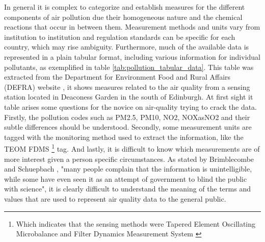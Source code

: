 In general it is complex to categorize and establish measures for the different components of air pollution due their homogeneous nature and the chemical reactions that occur in between them. Measurement methods and units vary from institution to institution and regulation standards can be specific for each country, which may rise ambiguity. Furthermore, much of the available data is represented in a plain tabular format, including various information for individual pollutants, as exemplified in table \ref{tab:pollution_tabular_data}. This table was extracted from the  Department for Environment Food and Rural Affairs (DEFRA) website \cite{DepartmentforEnvironmenta}, it shows measures related to the air quality from a sensing station located in Deaconess Garden in the south of Edinburgh. At first sight it table arises some questions for the novice on air-quality trying to crack the data. Firstly, the pollution codes such as PM2.5, PM10, NO2, NOXasNO2 and their subtle differences should be understood. Secondly, some measurement units are tagged with the monitoring method used to extract the information, like the TEOM FDMS \footnote{Which indicates that the sensing methods were Tapered Element Oscillating Microbalance and Filter Dynamics Measurement System \cite{Quality2005}} tag. And lastly, it is difficult to know which measurements are of more interest given a person specific circumstances. As stated by Brimblecombe and Schuepbach \cite{P.Brimblecombe2008}, "many people complain that the information is unintelligible, while some have even seen it as an attempt of government to blind the public with science", it is clearly difficult to understand the meaning of the terms and values that are used to represent air quality data to the general public. 
